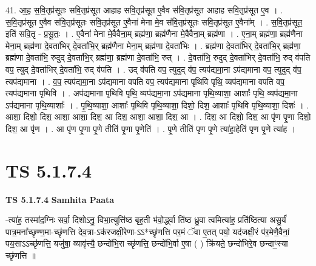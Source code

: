 \documentclass[17pt]{extarticle}
\begin{document}
41. आ॒ह॒ स॒वि॒तृप्र॑सूतः सवि॒तृप्र॑सूत आहाह सवि॒तृप्र॑सूत ए॒वैव स॑वि॒तृप्र॑सूत आहाह सवि॒तृप्र॑सूत ए॒व । . स॒वि॒तृप्र॑सूत ए॒वैव स॑वि॒तृप्र॑सूतः सवि॒तृप्र॑सूत ए॒वैना॑ मेना मे॒व स॑वि॒तृप्र॑सूतः सवि॒तृप्र॑सूत ए॒वैना᳚म् । . स॒वि॒तृप्र॑सूत॒ इति॑ सवि॒तृ - प्र॒सू॒तः॒ । . ए॒वैना॑ मेना मे॒वैवैना॒म् ब्रह्म॑णा॒ ब्रह्म॑णैना मे॒वैवैना॒म् ब्रह्म॑णा । . ए॒ना॒म् ब्रह्म॑णा॒ ब्रह्म॑णैना मेना॒म् ब्रह्म॑णा दे॒वता॑भिर् दे॒वता॑भि॒र् ब्रह्म॑णैना मेना॒म् ब्रह्म॑णा दे॒वता॑भिः । . ब्रह्म॑णा दे॒वता॑भिर् दे॒वता॑भि॒र् ब्रह्म॑णा॒ ब्रह्म॑णा दे॒वता॑भि॒ रुदुद् दे॒वता॑भि॒र् ब्रह्म॑णा॒ ब्रह्म॑णा दे॒वता॑भि॒ रुत् । . दे॒वता॑भि॒ रुदुद् दे॒वता॑भिर् दे॒वता॑भि॒ रुद् व॑पति वप॒ त्युद् दे॒वता॑भिर् दे॒वता॑भि॒ रुद् व॑पति । . उद् व॑पति वप॒ त्युदुद् व॑प॒ त्यप॑द्यमा॒ना ऽप॑द्यमाना वप॒ त्युदुद् व॑प॒ त्यप॑द्यमाना । . व॒प॒ त्यप॑द्यमा॒ना ऽप॑द्यमाना वपति वप॒ त्यप॑द्यमाना पृथिवि पृथि॒ व्यप॑द्यमाना वपति वप॒ त्यप॑द्यमाना पृथिवि । . अप॑द्यमाना पृथिवि पृथि॒ व्यप॑द्यमा॒ना ऽप॑द्यमाना पृथि॒व्याशा॒ आशाः᳚ पृथि॒ व्यप॑द्यमा॒ना ऽप॑द्यमाना पृथि॒व्याशाः᳚ । . पृ॒थि॒व्याशा॒ आशाः᳚ पृथिवि पृथि॒व्याशा॒ दिशो॒ दिश॒ आशाः᳚ पृथिवि पृथि॒व्याशा॒ दिशः॑ । . आशा॒ दिशो॒ दिश॒ आशा॒ आशा॒ दिश॒ आ दिश॒ आशा॒ आशा॒ दिश॒ आ । . दिश॒ आ दिशो॒ दिश॒ आ पृ॑ण पृ॒णा दिशो॒ दिश॒ आ पृ॑ण । . आ पृ॑ण पृ॒णा पृ॒णे तीति॑ पृ॒णा पृ॒णेति॑ । . पृ॒णे तीति॑ पृण पृ॒णे त्या॑हा॒हेति॑ पृण पृ॒णे त्या॑ह । \newline
\pagebreak
{}

\section{ TS 5.1.7.4 }

\textbf{TS 5.1.7.4 } \newline
\textbf{Samhita Paata} \newline

-त्या॑ह॒ तस्मा॑द॒ग्निः सर्वा॒ दिशोऽनु॒ विभा॒त्युत्ति॑ष्ठ बृह॒ती भ॑वो॒र्द्ध्वा ति॑ष्ठ ध्रु॒वा त्वमित्या॑ह॒ प्रति॑ष्ठित्या असु॒र्यं॑ पात्र॒मना᳚च्छृण्ण॒मा-च्छृ॑णत्ति देव॒त्रा-ऽक॑रजक्षी॒रेणा-ऽऽ*च्छृ॑णत्ति पर॒मं ॅवा ए॒तत् पयो॒ यद॑जक्षी॒रं प॑र॒मेणै॒वैनां॒ पय॒साऽऽच्छृ॑णत्ति॒ यजु॑षा॒ व्यावृ॑त्त्यै॒ छन्दो॑भि॒रा च्छृ॑णत्ति॒ छन्दो॑भि॒र्वा ए॒षा ( ) क्रि॑यते॒ छन्दो॑भिरे॒व छन्दाꣳ॒॒स्या च्छृ॑णत्ति ॥ \newline
\end{document}
